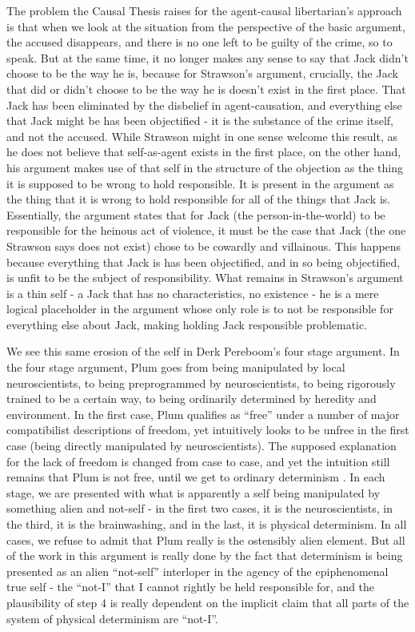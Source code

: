 \documentclass[phd,12pt,oneside,paper=letterpaper]{ubcthesis}
\begin{document}
The problem the Causal Thesis raises for the agent-causal libertarian's approach is that when we look at the situation from the perspective of the basic argument, the accused disappears, and there is no one left to be guilty of the crime, so to speak. But at the same time, it no longer makes any sense to say that Jack didn't choose to be the way he is, because for Strawson's argument, crucially, the Jack that did or didn't choose to be the way he is doesn't exist in the first place.   That Jack has been eliminated by the disbelief in agent-causation, and everything else that Jack might be has been objectified - it is the substance of the crime itself, and not the accused. While Strawson might in one sense welcome this result, as he does not believe that self-as-agent exists in the first place, on the other hand, his argument makes use of that self in the structure of the objection as the thing it is supposed to be wrong to hold responsible. It is present in the argument as the thing that it is wrong to hold responsible for all of the things that Jack is. Essentially, the argument states that for Jack (the person-in-the-world) to be responsible for the heinous act of violence, it must be the case that Jack (the one Strawson says does not exist) chose to be cowardly and villainous. This happens because everything that Jack is has been objectified, and in so being objectified, is unfit to be the subject of responsibility. What remains in Strawson's argument is a thin self - a Jack that has no characteristics, no existence - he is a mere logical placeholder in the argument whose only role is to not be responsible for everything else about Jack, making holding Jack responsible problematic. 

We see this same erosion of the self in Derk Pereboom's four stage argument. In the four stage argument, Plum goes from being manipulated by local neuroscientists, to being preprogrammed by neuroscientists, to being rigorously trained to be a certain way, to being ordinarily determined by heredity and environment. In the first case, Plum qualifies as ``free'' under a number of major compatibilist descriptions of freedom, yet intuitively looks to be unfree in the first case (being directly manipulated by neuroscientists). The supposed explanation for the lack of freedom is changed from case to case, and yet the intuition still remains that Plum is not free, until we get to ordinary determinism \citep[p 112-6]{pereboom2001}. In each stage, we are presented with what is apparently a self being manipulated by something alien and not-self - in the first two cases, it is the neuroscientists, in the third, it is the brainwashing, and in the last, it is physical determinism. In all cases, we refuse to admit that Plum really is the ostensibly alien element. But all of the work in this argument is really done by the fact that determinism is being presented as an alien ``not-self'' interloper in the agency of the epiphenomenal true self - the ``not-I'' that I cannot rightly be held responsible for, and the plausibility of step 4 is really dependent on the implicit claim that all parts of the system of physical determinism are ``not-I''.
\end{document}
